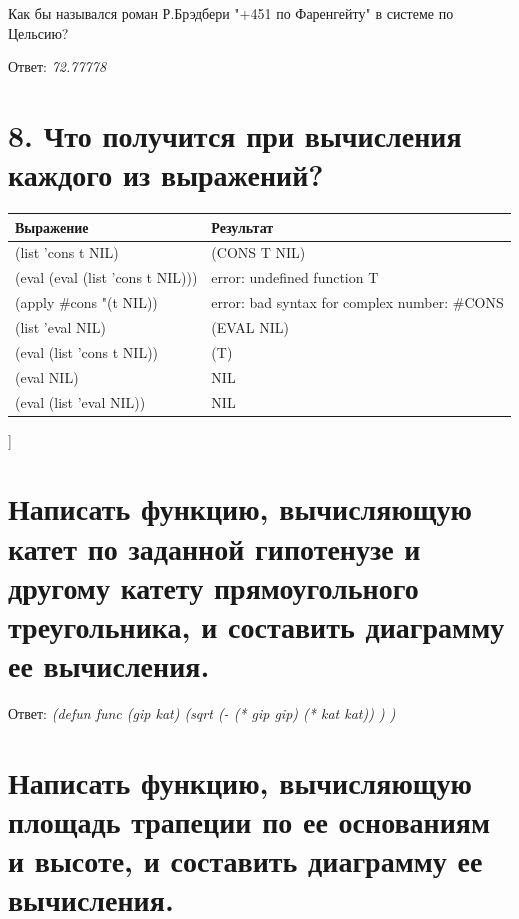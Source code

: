 \documentclass[a4paper,12pt]{article}
\begin{document}
	
	Как бы назывался роман Р.Брэдбери "+451 по Фаренгейту" в системе по Цельсию?
	
	Ответ: \textit{72.77778}
	
	
	
	\section*{8. Что получится при вычисления каждого из выражений?}
	
	\begin{table} [h!]
		\begin{center}
			\begin{tabular}{|l|l|}
				\hline
				{\bf  Выражение} &    {\bf Результат} \\
				\hline
				{(list 'cons t NIL)} & (CONS T NIL)\\
				\hline
				{(eval (eval (list 'cons t NIL)))} & error: undefined function T\\
				\hline
				{(apply \#cons "(t NIL))} & error: bad syntax for complex number: \#CONS\\
				\hline
				 {(list 'eval NIL)} & (EVAL NIL)\\
				 \hline
				 {(eval (list 'cons t NIL))} & (T)\\
				 \hline
				 {(eval NIL)} & NIL\\
				 \hline
				 {(eval (list 'eval NIL))} & NIL\\
				 \hline
			\end{tabular}  
			\label{m2}
		\end{center}
	\end{table}
	
	\newpage]
	
	\section*{Написать функцию, вычисляющую катет по заданной гипотенузе и другому катету прямоугольного треугольника, и составить диаграмму ее вычисления.}
	
	Ответ: \textit{(defun func (gip kat) (sqrt (- (* gip gip) (* kat kat)) ) )}
	
	\newpage
	
	\section*{Написать функцию, вычисляющую площадь трапеции по ее основаниям и
высоте, и составить диаграмму ее вычисления.
}
	
\end{document}
